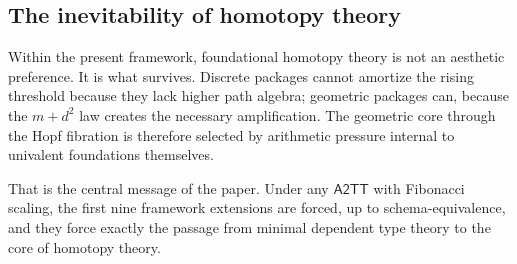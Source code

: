 \documentclass{lmcs}
\newcommand{\ATwoTT}{\mathsf{A2TT}}
\begin{document}
\subsection{The inevitability of homotopy theory}

Within the present framework, foundational homotopy theory is not an aesthetic preference. It is what survives. Discrete packages cannot amortize the rising threshold because they lack higher path algebra; geometric packages can, because the $m+d^2$ law creates the necessary amplification. The geometric core through the Hopf fibration is therefore selected by arithmetic pressure internal to univalent foundations themselves.

That is the central message of the paper. Under any $\ATwoTT$ with Fibonacci scaling, the first nine framework extensions are forced, up to schema-equivalence, and they force exactly the passage from minimal dependent type theory to the core of homotopy theory.



\end{document}
